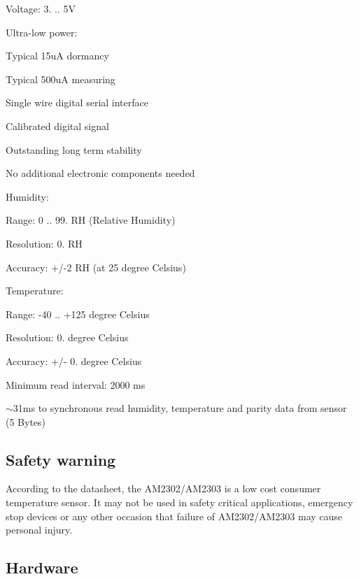 \begin{DoxyItemize}
\item Voltage\+: 3. .. 5V
\item Ultra-\/low power\+:
\begin{DoxyItemize}
\item Typical 15uA dormancy
\item Typical 500uA measuring
\end{DoxyItemize}
\item Single wire digital serial interface
\item Calibrated digital signal
\item Outstanding long term stability
\item No additional electronic components needed
\item Humidity\+:
\begin{DoxyItemize}
\item Range\+: 0 .. 99. RH (Relative Humidity)
\item Resolution\+: 0. RH
\item Accuracy\+: +/-\/2 RH (at 25 degree Celsius)
\end{DoxyItemize}
\item Temperature\+:
\begin{DoxyItemize}
\item Range\+: -\/40 .. +125 degree Celsius
\item Resolution\+: 0. degree Celsius
\item Accuracy\+: +/-\/ 0. degree Celsius
\end{DoxyItemize}
\item Minimum read interval\+: 2000 ms
\item $\sim$31ms to synchronous read humidity, temperature and parity data from sensor (5 Bytes)
\end{DoxyItemize}

\subsection*{Safety warning}

According to the datasheet, the A\+M2302/\+A\+M2303 is a low cost consumer temperature sensor. It may not be used in safety critical applications, emergency stop devices or any other occasion that failure of A\+M2302/\+A\+M2303 may cause personal injury.

\subsection*{Hardware}




